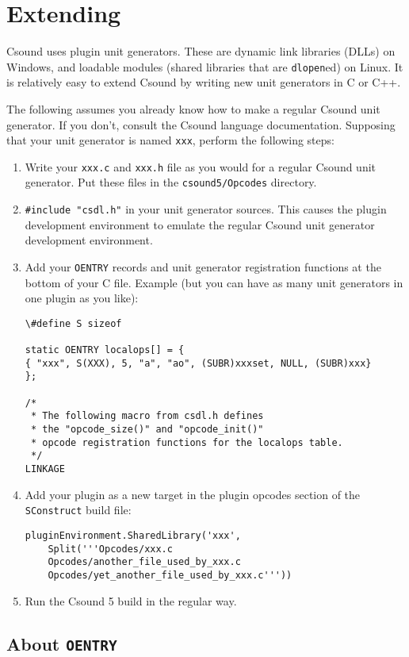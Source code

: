 \documentclass[10pt,letterpaper,onecolumn]{ltxguide}
\begin{document}
\section{Extending}
Csound uses plugin unit generators. These are dynamic link libraries (DLLs) on Windows, and loadable modules (shared libraries that are \texttt{dlopen}ed) on Linux. It is relatively easy to extend Csound by writing new unit generators in C or C++.

The following assumes you already know how to make a regular Csound unit generator. If you don't, consult the Csound language documentation.
Supposing that your unit generator is named \texttt{xxx}, perform the following steps:
\begin{enumerate}
\item Write your \texttt{xxx.c} and \texttt{xxx.h} file as you would for a regular Csound unit generator. Put these files in the \texttt{csound5/Opcodes} directory.
\item \texttt{\#include "csdl.h"} in your unit generator sources. This causes the plugin development environment to emulate the regular Csound unit generator development environment.
\item Add your \texttt{OENTRY} records and unit generator registration functions at the bottom of your C file. Example (but you can have as many unit generators in one plugin as you like):
\begin{lstlisting}
\#define S sizeof

static OENTRY localops[] = {
{ "xxx", S(XXX), 5, "a", "ao", (SUBR)xxxset, NULL, (SUBR)xxx}
};

/*
 * The following macro from csdl.h defines 
 * the "opcode_size()" and "opcode_init()" 
 * opcode registration functions for the localops table.
 */
LINKAGE
\end{lstlisting}
\item Add your plugin as a new target in the plugin opcodes section of the \texttt{SConstruct} build file:
\begin{lstlisting}
pluginEnvironment.SharedLibrary('xxx', 
    Split('''Opcodes/xxx.c 
    Opcodes/another_file_used_by_xxx.c 
    Opcodes/yet_another_file_used_by_xxx.c'''))
\end{lstlisting}
\item Run the Csound 5 build in the regular way.
\end{enumerate}		

\subsection{About \texttt{OENTRY}}
\end{document}
